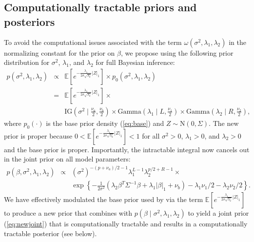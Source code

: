 \documentclass[12pt]{article}
\begin{document}
\subsection{Computationally tractable priors and posteriors}\label{sec:newprior}
To avoid the computational issues associated with the term $\omega(\sigma^2, \lambda_1, \lambda_2)$
in the normalizing constant for the prior on $\beta$, we propose using the following prior
distribution for $\sigma^2$, $\lambda_1$, and $\lambda_2$ for full Bayesian inference:
\begin{eqnarray}
	p(\sigma^2, \lambda_1, \lambda_2) &\propto& \mathbb{E}\left[e^{-\frac{\lambda_1} 
		{2\sigma\sqrt{\lambda_2}}|Z|_1}\right] \times p_0(\sigma^2, \lambda_1, \lambda_2) \nonumber \\
	&=& \mathbb{E}\left[e^{-\frac{\lambda_1}{2\sigma\sqrt{\lambda_2}}|Z|_1}\right] \times \nonumber \\
	&& \mbox{IG}\left(\sigma^2 \mid \frac{\nu_a}{2}, \frac{\nu_b}{2}\right) \times
			\mbox{Gamma}\left(\lambda_1 \mid L, \frac{\nu_1}{2}\right) \times 
	\mbox{Gamma}\left(\lambda_2 \mid R, \frac{\nu_2}{2}\right),
			\label{eq:newprior}
\end{eqnarray}
where $p_0(\cdot)$ is the base prior density (\ref{eq:base}) and $Z \sim \mbox{N}(0,\Sigma)$. 
The new prior is proper because
$0 < \mathbb{E}\left[e^{-\frac{\lambda_1}{2\sigma\sqrt{\lambda_2}}|Z|_1}\right] < 1$ 
for all $\sigma^2  > 0$, $\lambda_1 > 0$, and $\lambda_2 > 0$ and the base prior is proper.
Importantly, the intractable integral now cancels out in the joint prior on all model parameters:
\begin{eqnarray}
	p(\beta, \sigma^2, \lambda_1, \lambda_2) &\propto&
	(\sigma^2)^{-(p+\nu_a)/2 - 1} \lambda_1^{L-1} \lambda_2^{p/2 + R - 1} \times 
	\nonumber \\
	&& \exp\left\{-\frac{1}{2\sigma^2}\left(\lambda_2 \beta^T \Sigma^{-1}\beta + \lambda_1 |\beta|_1
		+ \nu_b\right) - \lambda_1\nu_1/2 - \lambda_2\nu_2/2 \right\}.  \label{eq:newjoint}
\end{eqnarray}
We have effectively modulated the base prior used by \citet{hans:11} via the term 
$\mathbb{E}\left[e^{-\frac{\lambda_1}{2\sigma\sqrt{\lambda_2}}|Z|_1}\right]$ to produce
a new prior that combines with $p(\beta \mid \sigma^2, \lambda_1, \lambda_2)$ to yield a
joint prior (\ref{eq:newjoint}) that is computationally tractable and results in a 
computationally tractable posterior (see below).
\end{document}
